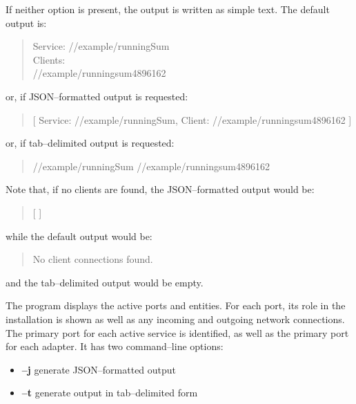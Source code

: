 If neither option is present, the output is written as simple text.
The default output is:
\begin{quote}
Service: /\serviceName/example/runningSum\\
\settowidth{\utilLen}{Service: }%
Clients:\\
\hspace*{\utilLen}/\clientName/example/runningsum\textunderscore{}4896162
\end{quote}
or, if JSON--formatted output is requested:
\begin{quote}
[ \textbraceleft{} \dquote{}Service\dquote{}:
\dquote{}/\serviceName/example/runningSum\dquote{},
 \dquote{}Client\dquote{}:
 \dquote{}/\clientName/example/runningsum\textunderscore{}4896162\dquote{}
 \textbraceright{} ]
\end{quote}
or, if tab--delimited output is requested:
\begin{quote}
/\serviceName/example/runningSum\pseudotab{}%
/\clientName/example/runningsum\textunderscore{}4896162
\end{quote}
Note that, if no clients are found, the JSON--formatted output would be:
\begin{quote}
[  ]
\end{quote}
while the default output would be:
\begin{quote}
No client connections found.
\end{quote}
and the tab--delimited output would be empty.



The program  displays the active \yarp{} ports and \mplusm{}
entities.
For each \yarp{} port, its role in the \mplusm{} installation is shown as well as any
incoming and outgoing \yarp{} network connections.
The primary port for each active service is identified, as well as the primary port for
each adapter.
It has two command--line options:
\begin{itemize}
\item \textbf{--j} generate JSON--formatted output
\item \textbf{--t} generate output in tab--delimited form
\end{itemize}

